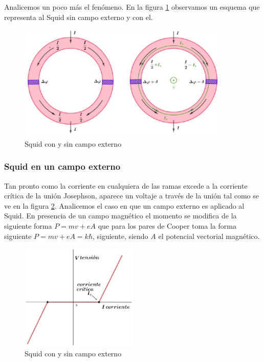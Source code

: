 Analicemos un poco más el fenómeno. En la figura \ref{fig:440} observamos un esquema que representa al Squid sin campo externo y con el.

\begin{figure}[H]
    \centering
    \includegraphics[width=0.9\textwidth]{./Figures/fig440}
	\caption{Squid con y sin campo externo}
	\label{fig:440}
\end{figure}

\subsubsection{Squid en un campo externo}

Tan pronto como la corriente en cualquiera de las ramas excede a la corriente crítica de la unión Josephson, aparece un voltaje a través de la unión tal como se ve en la figura \ref{fig:441}. Analicemos el caso en que un campo externo es aplicado al Squid. En presencia de un campo magnético el momento se modifica de la siguiente forma $P=mv+eA$ que para los pares de Cooper toma la forma siguiente $P=mv+eA= k\hbar$, siguiente, siendo $A$ el potencial vectorial magnético. 

\begin{figure}[H]
    \centering
    \includegraphics[width=0.5\textwidth]{./Figures/fig441}
	\caption{Squid con y sin campo externo}
	\label{fig:441}
\end{figure}



